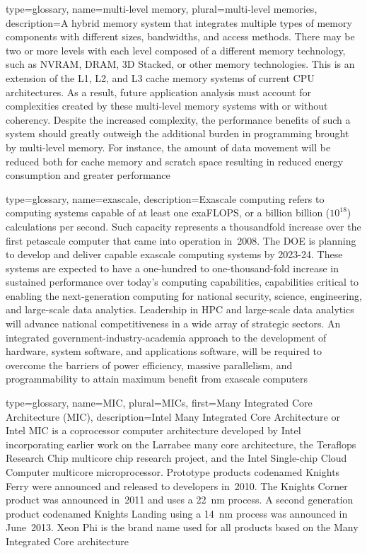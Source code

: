 {
  type={glossary},
  name={multi-level memory},
  plural={multi-level memories},
  description={A hybrid memory system that integrates multiple types
  of memory components with different sizes, bandwidths, and access
  methods. There may be two or more levels with each level composed of
  a different memory technology, such as NVRAM, DRAM, 3D Stacked, or
  other memory technologies. This is an extension of the L1, L2, and
  L3 cache memory systems of current \gls{CPU} architectures. As a result,
  future application analysis must account for complexities created by
  these multi-level memory systems with or without coherency. Despite
  the increased complexity, the performance benefits of such a system
  should greatly outweigh the additional burden in programming brought
  by multi-level memory. For instance, the amount of data movement
  will be reduced both for cache memory and scratch space resulting in
  reduced energy consumption and greater performance~\cite{AbstractMachine}}  
}

{
  type={glossary},
  name={exascale},
  description={Exascale computing refers to computing systems capable
  of at least one exaFLOPS, or a billion billion ($10^{18}$)
  calculations per second. Such capacity represents a thousandfold
  increase over the first petascale computer that came into operation
  in~2008. The \gls{DOE} is planning to develop and deliver capable
  exascale computing systems by 2023-24. These systems are expected to
  have a one-hundred to one-thousand-fold increase in sustained
  performance over today's computing capabilities, capabilities
  critical to enabling the next-generation computing for national
  security, science, engineering, and large-scale data analytics.
  Leadership in \gls{HPC} and large-scale data analytics will advance
  national competitiveness in a wide array of strategic sectors. An
  integrated government-industry-academia approach to the development
  of hardware, system software, and applications software, will be
  required to overcome the barriers of power efficiency, massive
  parallelism, and programmability to attain maximum benefit from
  exascale computers}
}

{
  type={glossary},
  name={MIC},
  plural={MICs},
  first={Many Integrated Core Architecture (MIC)},
  description={Intel Many Integrated Core Architecture or Intel MIC
  is a coprocessor computer architecture developed by Intel
  incorporating earlier work on the Larrabee many core architecture,
  the Teraflops Research Chip multicore chip research project, and the
  Intel Single-chip Cloud Computer multicore microprocessor. Prototype
  products codenamed Knights Ferry were announced and released to
  developers in~2010. The Knights Corner product was announced in~2011
  and uses a 22~nm process. A second generation product codenamed
  Knights Landing using a 14~nm process was announced in June~2013.
  Xeon Phi is the brand name used for all products based on the
  Many Integrated Core architecture}  
}

